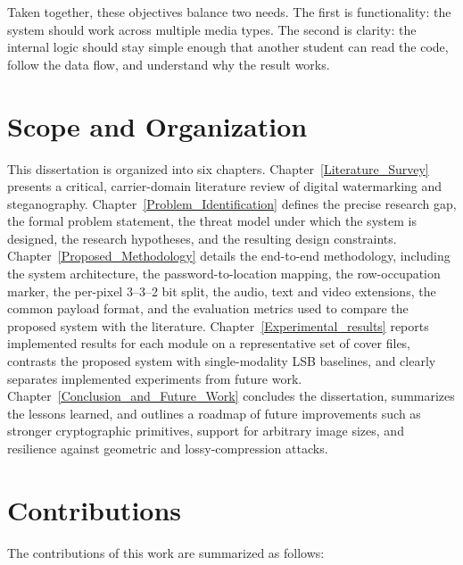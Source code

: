 Taken together, these objectives balance two needs. The first is functionality: the system should work across multiple media types. The second is clarity: the internal logic should stay simple enough that another student can read the code, follow the data flow, and understand why the result works.

\section{Scope and Organization}

This dissertation is organized into six chapters. Chapter~\ref{Literature_Survey} presents a critical, carrier-domain literature review of digital watermarking and steganography. Chapter~\ref{Problem_Identification} defines the precise research gap, the formal problem statement, the threat model under which the system is designed, the research hypotheses, and the resulting design constraints. Chapter~\ref{Proposed_Methodology} details the end-to-end methodology, including the system architecture, the password-to-location mapping, the row-occupation marker, the per-pixel 3--3--2 bit split, the audio, text and video extensions, the common payload format, and the evaluation metrics used to compare the proposed system with the literature. Chapter~\ref{Experimental_results} reports implemented results for each module on a representative set of cover files, contrasts the proposed system with single-modality LSB baselines, and clearly separates implemented experiments from future work. Chapter~\ref{Conclusion_and_Future_Work} concludes the dissertation, summarizes the lessons learned, and outlines a roadmap of future improvements such as stronger cryptographic primitives, support for arbitrary image sizes, and resilience against geometric and lossy-compression attacks.

\section{Contributions}

The contributions of this work are summarized as follows:

